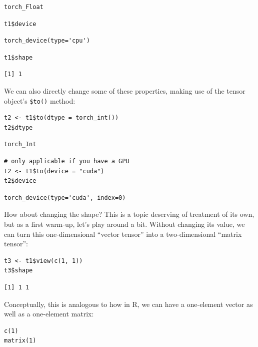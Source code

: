 \documentclass[
  letterpaper,
]{krantz}
\begin{document}
\begin{verbatim}
torch_Float
\end{verbatim}

\begin{verbatim}
t1$device
\end{verbatim}

\begin{verbatim}
torch_device(type='cpu')
\end{verbatim}

\begin{verbatim}
t1$shape
\end{verbatim}

\begin{verbatim}
[1] 1
\end{verbatim}

We can also directly change some of these properties, making use of the
tensor object's \texttt{\$to()} method:

\begin{verbatim}
t2 <- t1$to(dtype = torch_int())
t2$dtype
\end{verbatim}

\begin{verbatim}
torch_Int
\end{verbatim}

\begin{verbatim}
# only applicable if you have a GPU
t2 <- t1$to(device = "cuda")
t2$device
\end{verbatim}

\begin{verbatim}
torch_device(type='cuda', index=0)
\end{verbatim}

How about changing the shape? This is a topic deserving of treatment of
its own, but as a first warm-up, let's play around a bit. Without
changing its value, we can turn this one-dimensional ``vector tensor''
into a two-dimensional ``matrix tensor'':

\begin{verbatim}
t3 <- t1$view(c(1, 1))
t3$shape
\end{verbatim}

\begin{verbatim}
[1] 1 1
\end{verbatim}

Conceptually, this is analogous to how in R, we can have a one-element
vector as well as a one-element matrix:

\begin{verbatim}
c(1)
matrix(1)
\end{verbatim}
\end{document}
